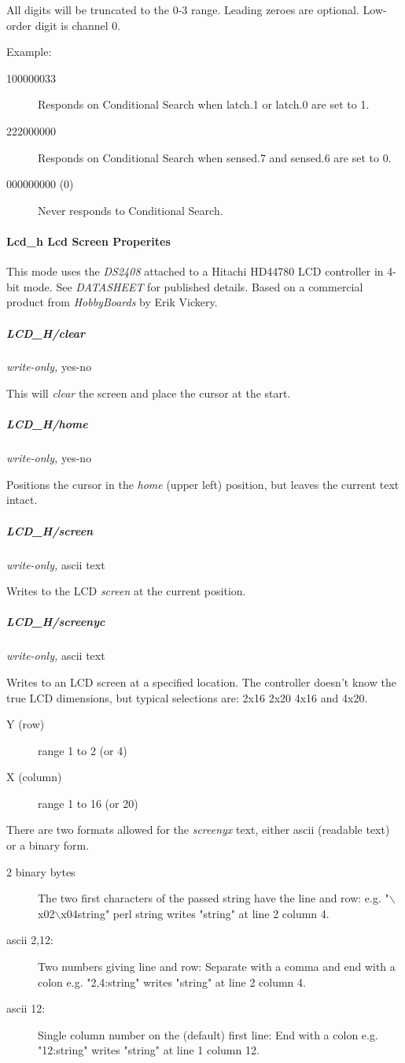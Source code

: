 All digits will be truncated to the 0-3 range. Leading
zeroes are optional. Low-order digit is channel 0. 

Example: \begin{description}
\item [100000033 ] Responds
on Conditional Search when latch.1 or latch.0 are set to 1. 
\item [222000000 ] Responds
on Conditional Search when sensed.7 and sensed.6 are set to 0. 
\item [000000000 (0)
] Never responds to Conditional Search. 
\end{description}

\paragraph*{Lcd\_h Lcd Screen Properites}
This mode
uses the  \textit{DS2408} attached to a Hitachi HD44780 LCD controller in 4-bit mode.
See  \textit{DATASHEET} for published details. Based on a commercial product from
\textit{HobbyBoards} by Erik Vickery. 
\subparagraph*{LCD\_H/clear}\textit{write-only,} yes-no 

This will \textit{clear} the screen and place the cursor at the start. 
\subparagraph*{LCD\_H/home}\textit{write-only,}
yes-no 

Positions the cursor in the \textit{home} (upper left) position, but leaves the
current text intact. 
\subparagraph*{LCD\_H/screen}\textit{write-only,} ascii text 

Writes to the LCD  \textit{screen} at the current position. 
\subparagraph*{LCD\_H/screenyc}\textit{write-only,}
ascii text 

Writes to an LCD screen at a specified location. The controller doesn't know
the true LCD dimensions, but typical selections are: 2x16 2x20 4x16 and
4x20. \begin{description}
\item [Y (row) ] range 1 to 2 (or 4) 
\item [X (column) ] range 1 to 16 (or 20) 
\end{description}


There
are two formats allowed for the \textit{screenyx} text, either ascii (readable text)
or a binary form. \begin{description}
\item [2 binary bytes ] The two first characters of the passed
string have the line and row:  e.g. "$\backslash$x02$\backslash$x04string" perl string writes "string"
at line 2 column 4. 
\item [ascii 2,12: ] Two numbers giving line and row:  Separate
with a comma and end with a colon e.g. "2,4:string" writes "string" at line
2 column 4. 
\item [ascii 12: ] Single column number on the (default) first line:
 End with a colon e.g. "12:string" writes "string" at line 1 column 12. 
\end{description}


